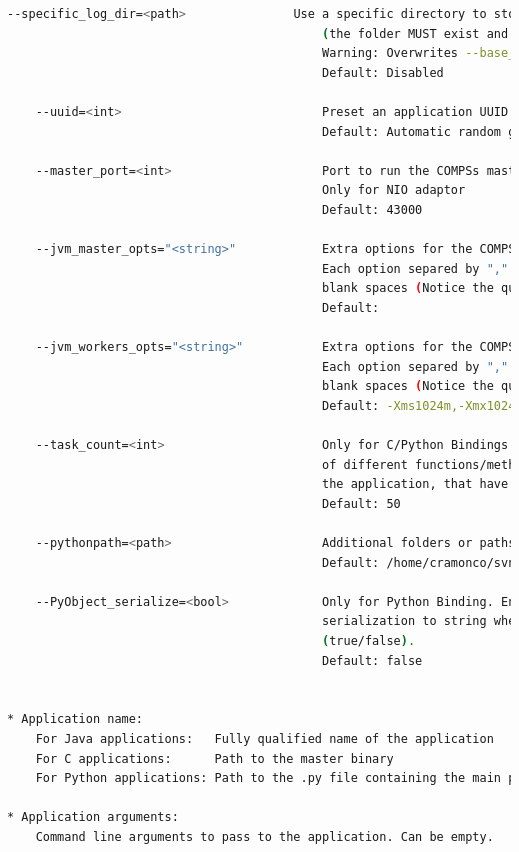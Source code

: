 \begin{lstlisting}[language=bash]
    --specific_log_dir=<path>               Use a specific directory to store COMPSs log files 
                                            (the folder MUST exist and no sandbox is created)
                                            Warning: Overwrites --base_log_dir option
                                            Default: Disabled
                                            
    --uuid=<int>                            Preset an application UUID
                                            Default: Automatic random generation
                                            
    --master_port=<int>                     Port to run the COMPSs master communications.
                                            Only for NIO adaptor
                                            Default: 43000
                                            
    --jvm_master_opts="<string>"            Extra options for the COMPSs Master JVM. 
                                            Each option separed by "," and without 
                                            blank spaces (Notice the quotes)
                                            Default: 
                                            
    --jvm_workers_opts="<string>"           Extra options for the COMPSs Workers JVMs.
                                            Each option separed by "," and without 
                                            blank spaces (Notice the quotes)
                                            Default: -Xms1024m,-Xmx1024m,-Xmn400m
                                            
    --task_count=<int>                      Only for C/Python Bindings. Maximum number 
                                            of different functions/methods, invoked from 
                                            the application, that have been selected as tasks
                                            Default: 50
                                            
    --pythonpath=<path>                     Additional folders or paths to add to the PYTHONPATH
                                            Default: /home/cramonco/svn/compss/framework/trunk/compss
                                            
    --PyObject_serialize=<bool>             Only for Python Binding. Enable the object 
                                            serialization to string when possible 
                                            (true/false).
                                            Default: false


* Application name:
    For Java applications:   Fully qualified name of the application
    For C applications:      Path to the master binary
    For Python applications: Path to the .py file containing the main program

* Application arguments:
    Command line arguments to pass to the application. Can be empty.

\end{lstlisting}


